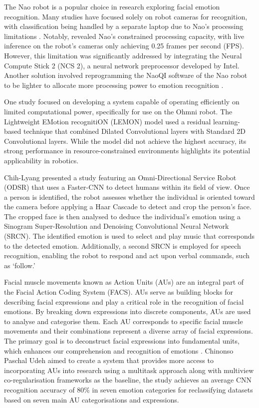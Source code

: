 The Nao robot is a popular choice in research exploring facial emotion recognition. Many studies have focused solely on robot cameras for recognition, with classification being handled by a separate laptop due to Nao's processing limitations \cite{Ruiz-Garcia2018-zq}. Notably, \cite{Melinte2020-ky} revealed Nao's constrained processing capacity, with live inference on the robot's cameras only achieving 0.25 frames per second (FPS). However, this limitation was significantly addressed by integrating the Neural Compute Stick 2 (NCS 2), a neural network preprocessor developed by Intel. Another solution involved reprogramming the NaoQI software of the Nao robot to be lighter to allocate more processing power to emotion recognition \cite{Lopez-Rincon2019-et}.

One study focused on developing a system capable of operating efficiently on limited computational power, specifically for use on the Ohmni robot. The Lightweight EMotion recognitiON (LEMON) model \cite{Devaram2022-qc} used a residual learning-based technique that combined Dilated Convolutional layers with Standard 2D Convolutional layers. While the model did not achieve the highest accuracy, its strong performance in resource-constrained environments highlights its potential applicability in robotics.

Chih-Lyang \cite{9982640} presented a study featuring an Omni-Directional Service Robot (ODSR) that uses a Faster-CNN to detect humans within its field of view. Once a person is identified, the robot assesses whether the individual is oriented toward the camera before applying a Haar Cascade to detect and crop the person's face. The cropped face is then analysed to deduce the individual's emotion using a Sinogram Super-Resolution and Denoising Convolutional Neural Network (SRCN). The identified emotion is used to select and play music that corresponds to the detected emotion. Additionally, a second SRCN is employed for speech recognition, enabling the robot to respond and act upon verbal commands, such as `follow.'

Facial muscle movements known as Action Units (AUs) are an integral part of the Facial Action Coding System (FACS). AUs serve as building blocks for describing facial expressions and play a critical role in the recognition of facial emotions. By breaking down expressions into discrete components, AUs are used to analyse and categorise them. Each AU corresponds to specific facial muscle movements and their combinations represent a diverse array of facial expressions. The primary goal is to deconstruct facial expressions into fundamental units, which enhances our comprehension and recognition of emotions \cite{Mohammadpour2017-xk}. Chinonso Paschal Udeh \cite{Udeh2022-me} aimed to create a system that provides more access to incorporating AUs into research using a multitask approach along with multiview co-regularisation frameworks as the baseline, the study achieves an average CNN recognition accuracy of 80\% in seven emotion categories for reclassifying datasets based on seven main AU categorisations and expressions.

